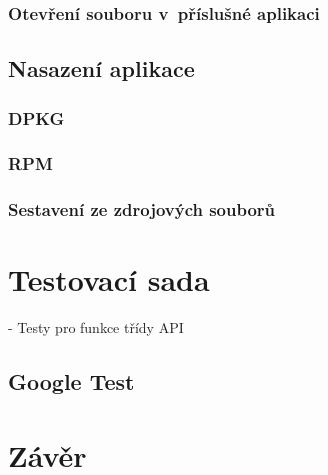 \subsection{Otevření souboru v příslušné aplikaci}

\cite{xdg}

\section{Nasazení aplikace}
\subsection{DPKG} %
\subsection{RPM} %
\subsection{Sestavení ze zdrojových souborů}

\chapter{Testovací sada}

- Testy pro funkce třídy API

\section{Google Test}

\chapter{Závěr}



